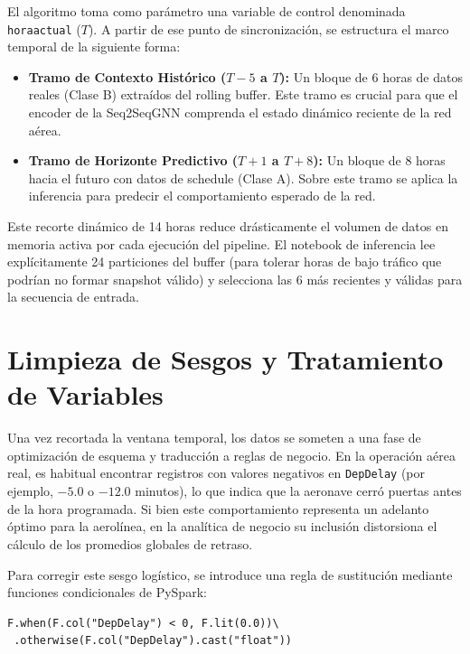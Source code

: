 \documentclass[12pt,oneside,a4paper]{report}
\renewcommand{\_}{\textunderscore\allowbreak}
\begin{document}
El algoritmo toma como parámetro una variable de control denominada \texttt{hora\_actual} ($T$). A partir de ese punto de sincronización, se estructura el marco temporal de la siguiente forma:

\begin{itemize}
    \item \textbf{Tramo de Contexto Histórico ($T-5$ a $T$):} Un bloque de 6 horas de datos reales (Clase B) extraídos del rolling buffer. Este tramo es crucial para que el encoder de la Seq2SeqGNN comprenda el estado dinámico reciente de la red aérea.
    \item \textbf{Tramo de Horizonte Predictivo ($T+1$ a $T+8$):} Un bloque de 8 horas hacia el futuro con datos de schedule (Clase A). Sobre este tramo se aplica la inferencia para predecir el comportamiento esperado de la red.
\end{itemize}

Este recorte dinámico de 14 horas reduce drásticamente el volumen de datos en memoria activa por cada ejecución del pipeline. El notebook de inferencia lee explícitamente 24 particiones del buffer (para tolerar horas de bajo tráfico que podrían no formar snapshot válido) y selecciona las 6 más recientes y válidas para la secuencia de entrada.

\section{Limpieza de Sesgos y Tratamiento de Variables}
\label{sec:limpieza_sesgos}

Una vez recortada la ventana temporal, los datos se someten a una fase de optimización de esquema y traducción a reglas de negocio. En la operación aérea real, es habitual encontrar registros con valores negativos en \texttt{DepDelay} (por ejemplo, $-5.0$ o $-12.0$ minutos), lo que indica que la aeronave cerró puertas antes de la hora programada. Si bien este comportamiento representa un adelanto óptimo para la aerolínea, en la analítica de negocio su inclusión distorsiona el cálculo de los promedios globales de retraso.

Para corregir este sesgo logístico, se introduce una regla de sustitución mediante funciones condicionales de PySpark:

\begin{lstlisting}[style=pystyle, caption={Tratamiento de valores negativos de retraso en PySpark.}]
F.when(F.col("DepDelay") < 0, F.lit(0.0))\
 .otherwise(F.col("DepDelay").cast("float"))
\end{lstlisting}
\end{document}
